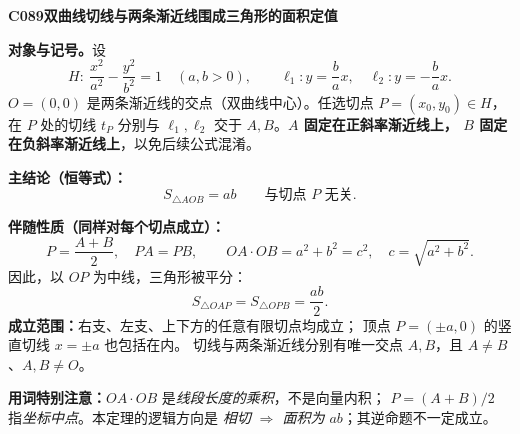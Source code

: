 \begin{statementbox}
\textbf{C089\quad 双曲线切线与两条渐近线围成三角形的面积定值}

\textbf{对象与记号。}设
\[
H:\ \frac{x^2}{a^2}-\frac{y^2}{b^2}=1\quad (a,b>0),\qquad
\ell_1:y=\frac ba x,\quad \ell_2:y=-\frac ba x.
\]
$O=(0,0)$ 是两条渐近线的交点（双曲线中心）。任选切点
$P=(x_0,y_0)\in H$，在 $P$ 处的切线 $t_P$ 分别与
$\ell_1,\ell_2$ 交于 $A,B$。\textbf{$A$ 固定在正斜率渐近线上，
$B$ 固定在负斜率渐近线上}，以免后续公式混淆。

\textbf{主结论（恒等式）：}
\[
\boxed{S_{\triangle AOB}=ab}\qquad\text{与切点 $P$ 无关}.
\]
\begin{center}

\end{center}

\textbf{伴随性质（同样对每个切点成立）：}
\[
\boxed{P=\frac{A+B}{2},\quad PA=PB},\qquad
\boxed{OA\cdot OB=a^2+b^2=c^2},\quad c=\sqrt{a^2+b^2}.
\]
因此，以 $OP$ 为中线，三角形被平分：
\[
\boxed{S_{\triangle OAP}=S_{\triangle OPB}=\frac{ab}{2}}.
\]
\textbf{成立范围：}右支、左支、上下方的任意有限切点均成立；
顶点 $P=(\pm a,0)$ 的竖直切线 $x=\pm a$ 也包括在内。
切线与两条渐近线分别有唯一交点 $A,B$，且 $A\neq B$、$A,B\neq O$。

\textbf{用词特别注意：}$OA\cdot OB$ 是\emph{线段长度的乘积}，不是向量内积；
$P=(A+B)/2$ 指\emph{坐标中点}。本定理的逻辑方向是
\emph{相切 $\Rightarrow$ 面积为 $ab$}；其逆命题不一定成立。
\end{statementbox}
